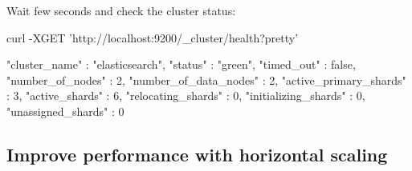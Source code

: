 \documentclass[]{beamer}
\begin{document}
\begin{frame}[containsverbatim]{\subsecname{}}
  Wait few seconds and check the cluster status:

  \begin{command}
curl -XGET 'http://localhost:9200/_cluster/health?pretty'
  \end{command}

  \begin{command}
{
  "cluster_name" : "elasticsearch",
  "status" : "green",
  "timed_out" : false,
  "number_of_nodes" : 2,
  "number_of_data_nodes" : 2,
  "active_primary_shards" : 3,
  "active_shards" : 6,
  "relocating_shards" : 0,
  "initializing_shards" : 0,
  "unassigned_shards" : 0
}
  \end{command}
\end{frame}

\subsection{Improve performance with horizontal scaling}
\end{document}
